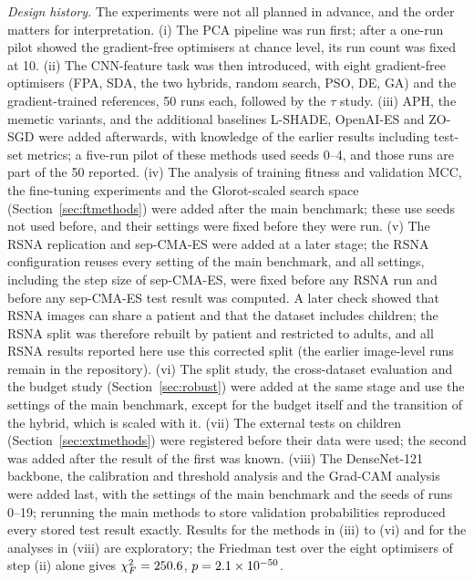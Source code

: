 \documentclass[preprint,12pt]{elsarticle}
\begin{document}
\emph{Design history.} The experiments were not all planned in advance, and the order matters for interpretation. (i) The PCA pipeline was run first; after a one-run pilot showed the gradient-free optimisers at chance level, its run count was fixed at 10. (ii) The CNN-feature task was then introduced, with eight gradient-free optimisers (FPA, SDA, the two hybrids, random search, PSO, DE, GA) and the gradient-trained references, 50 runs each, followed by the $\tau$ study. (iii) APH, the memetic variants, and the additional baselines L-SHADE, OpenAI-ES and ZO-SGD were added afterwards, with knowledge of the earlier results including test-set metrics; a five-run pilot of these methods used seeds 0--4, and those runs are part of the 50 reported. (iv) The analysis of training fitness and validation MCC, the fine-tuning experiments and the Glorot-scaled search space (Section~\ref{sec:ftmethods}) were added after the main benchmark; these use seeds not used before, and their settings were fixed before they were run. (v) The RSNA replication and sep-CMA-ES were added at a later stage; the RSNA configuration reuses every setting of the main benchmark, and all settings, including the step size of sep-CMA-ES, were fixed before any RSNA run and before any sep-CMA-ES test result was computed. A later check showed that RSNA images can share a patient and that the dataset includes children; the RSNA split was therefore rebuilt by patient and restricted to adults, and all RSNA results reported here use this corrected split (the earlier image-level runs remain in the repository). (vi) The split study, the cross-dataset evaluation and the budget study (Section~\ref{sec:robust}) were added at the same stage and use the settings of the main benchmark, except for the budget itself and the transition of the hybrid, which is scaled with it. (vii) The external tests on children (Section~\ref{sec:extmethods}) were registered before their data were used; the second was added after the result of the first was known. (viii) The DenseNet-121 backbone, the calibration and threshold analysis and the Grad-CAM analysis were added last, with the settings of the main benchmark and the seeds of runs 0--19; rerunning the main methods to store validation probabilities reproduced every stored test result exactly. Results for the methods in (iii) to (vi) and for the analyses in (viii) are exploratory; the Friedman test over the eight optimisers of step (ii) alone gives $\chi^2_F=250.6$, $p=2.1\times 10^{-50}$.
\end{document}
